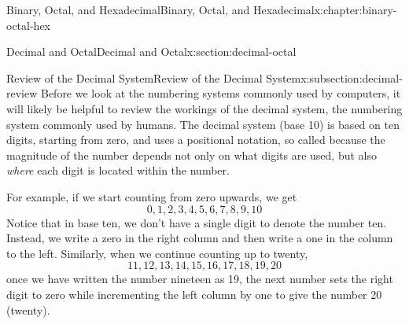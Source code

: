 \documentclass[twoside,10pt,]{book}
\numberwithin{equation}{section}
\begin{document}
\par\medskip
{}
\null\clearpage
\setcounter{tocdepth}{1}
\renewcommand*\contentsname{Contents}
\tableofcontents
\mainmatter
%
%
\typeout{************************************************}
\typeout{************************************************}
%
\begin{chapterptx}{Binary, Octal, and Hexadecimal}{}{Binary, Octal, and Hexadecimal}{}{}{x:chapter:binary-octal-hex}
%
%
\typeout{************************************************}
\typeout{************************************************}
%
\begin{sectionptx}{Decimal and Octal}{}{Decimal and Octal}{}{}{x:section:decimal-octal}
%
%
\typeout{************************************************}
\typeout{************************************************}
%
\begin{subsectionptx}{Review of the Decimal System}{}{Review of the Decimal System}{}{}{x:subsection:decimal-review}
Before we look at the numbering systems commonly used by computers, it will likely be helpful to review the workings of the decimal system, the numbering system commonly used by humans.  The decimal system (base 10) is based on ten digits, starting from zero, and uses a positional notation, so called because the magnitude of the number depends not only on what digits are used, but also \emph{where} each digit is located within the number.%
\par
For example, if we start counting from zero upwards, we get%
\begin{equation*}
0, 1, 2, 3, 4, 5, 6, 7, 8, 9, 10
\end{equation*}
Notice that in base ten, we don't have a single digit to denote the number ten.  Instead, we write a zero in the right column and then write a one in the column to the left.  Similarly, when we continue counting up to twenty,%
\begin{equation*}
11, 12, 13, 14, 15, 16, 17, 18, 19, 20
\end{equation*}
once we have written the number nineteen as 19, the next number sets the right digit to zero while incrementing the left column by one to give the number 20 (twenty).%
\par

\end{subsectionptx}
\end{sectionptx}
\end{chapterptx}
\end{document}
